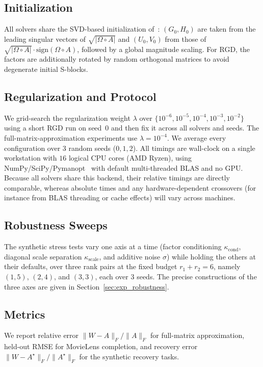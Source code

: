 \documentclass[letterpaper, 10 pt, conference]{ieeeconf}
\newcommand{\Had}{\circ}
\theoremstyle{plain}
\theoremstyle{definition}
\theoremstyle{remark}
\begin{document}
\subsection{Initialization}
All solvers share the SVD-based initialization of~\cite{wertz2024bcd}: $(G_0,H_0)$ are taken from the leading singular vectors of $\sqrt{|\Omega\Had A|}$ and $(U_0,V_0)$ from those of $\sqrt{|\Omega\Had A|}\cdot\mathrm{sign}(\Omega\Had A)$, followed by a global magnitude scaling. For RGD, the factors are additionally rotated by random orthogonal matrices to avoid degenerate initial S-blocks.

\subsection{Regularization and Protocol}
We grid-search the regularization weight $\lambda$ over $\{10^{-6},10^{-5},10^{-4},10^{-3},10^{-2}\}$ using a short RGD run on seed~$0$ and then fix it across all solvers and seeds. The full-matrix-approximation experiments use $\lambda = 10^{-4}$. We average every configuration over $3$ random seeds ($0,1,2$). All timings are wall-clock on a single workstation with $16$ logical CPU cores (AMD Ryzen), using NumPy/SciPy/Pymanopt~\cite{pymanopt} with default multi-threaded BLAS and no GPU. Because all solvers share this backend, their relative timings are directly comparable, whereas absolute times and any hardware-dependent crossovers (for instance from BLAS threading or cache effects) will vary across machines.

\subsection{Robustness Sweeps}
The synthetic stress tests vary one axis at a time (factor conditioning $\kappa_{\mathrm{cond}}$, diagonal scale separation $\kappa_{\mathrm{scale}}$, and additive noise $\sigma$) while holding the others at their defaults, over three rank pairs at the fixed budget $r_1{+}r_2 = 6$, namely $(1,5)$, $(2,4)$, and $(3,3)$, each over $3$ seeds. The precise constructions of the three axes are given in Section~\ref{sec:exp_robustness}.

\subsection{Metrics}
We report relative error $\|W-A\|_F/\|A\|_F$ for full-matrix approximation, held-out RMSE for MovieLens completion, and recovery error $\|W-A^\star\|_F/\|A^\star\|_F$ for the synthetic recovery tasks.
\end{document}
